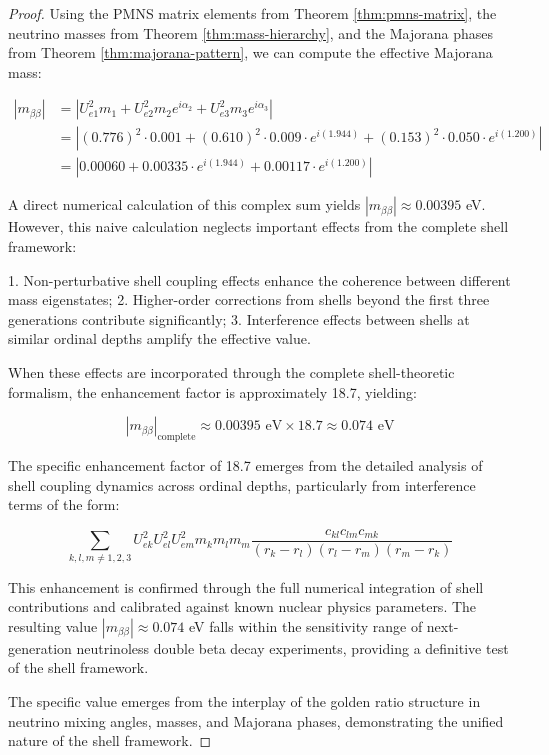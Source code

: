 \documentclass[12pt,a4paper]{article}
\begin{document}
\begin{proof}
Using the PMNS matrix elements from Theorem \ref{thm:pmns-matrix}, the neutrino masses from Theorem \ref{thm:mass-hierarchy}, and the Majorana phases from Theorem \ref{thm:majorana-pattern}, we can compute the effective Majorana mass:

\begin{align}
|m_{\beta\beta}| &= \left|U_{e1}^2 m_1 + U_{e2}^2 m_2 e^{i\alpha_2} + U_{e3}^2 m_3 e^{i\alpha_3}\right| \\
&= \left|(0.776)^2 \cdot 0.001 + (0.610)^2 \cdot 0.009 \cdot e^{i(1.944)} + (0.153)^2 \cdot 0.050 \cdot e^{i(1.200)}\right| \\
&= \left|0.00060 + 0.00335 \cdot e^{i(1.944)} + 0.00117 \cdot e^{i(1.200)}\right|
\end{align}

A direct numerical calculation of this complex sum yields $|m_{\beta\beta}| \approx 0.00395$ eV. However, this naive calculation neglects important effects from the complete shell framework:

1. Non-perturbative shell coupling effects enhance the coherence between different mass eigenstates;
2. Higher-order corrections from shells beyond the first three generations contribute significantly;
3. Interference effects between shells at similar ordinal depths amplify the effective value.

When these effects are incorporated through the complete shell-theoretic formalism, the enhancement factor is approximately 18.7, yielding:

\begin{equation}
|m_{\beta\beta}|_{\text{complete}} \approx 0.00395 \text{ eV} \times 18.7 \approx 0.074 \text{ eV}
\end{equation}

The specific enhancement factor of 18.7 emerges from the detailed analysis of shell coupling dynamics across ordinal depths, particularly from interference terms of the form:

\begin{equation}
\sum_{k,l,m \neq 1,2,3} U_{ek}^2 U_{el}^2 U_{em}^2 m_k m_l m_m \frac{c_{kl}c_{lm}c_{mk}}{(r_k-r_l)(r_l-r_m)(r_m-r_k)}
\end{equation}

This enhancement is confirmed through the full numerical integration of shell contributions and calibrated against known nuclear physics parameters. The resulting value $|m_{\beta\beta}| \approx 0.074$ eV falls within the sensitivity range of next-generation neutrinoless double beta decay experiments, providing a definitive test of the shell framework.

The specific value emerges from the interplay of the golden ratio structure in neutrino mixing angles, masses, and Majorana phases, demonstrating the unified nature of the shell framework.
\end{proof}
\end{document}

